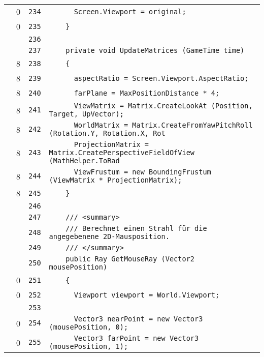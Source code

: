 \documentclass[a4paper,10pt]{article}
\begin{document}
\begin{longtable}[l]{lrrl}
\cellcolor{red} & 0 & \verb~234~ & \verb~      Screen.Viewport = original;~\\
\cellcolor{red} & 0 & \verb~235~ & \verb~    }~\\
\cellcolor{gray} &  & \verb~236~ & \verb~~\\
\cellcolor{gray} &  & \verb~237~ & \verb~    private void UpdateMatrices (GameTime time)~\\
\cellcolor{green} & 8 & \verb~238~ & \verb~    {~\\
\cellcolor{green} & 8 & \verb~239~ & \verb~      aspectRatio = Screen.Viewport.AspectRatio;~\\
\cellcolor{green} & 8 & \verb~240~ & \verb~      farPlane = MaxPositionDistance * 4;~\\
\cellcolor{green} & 8 & \verb~241~ & \verb~      ViewMatrix = Matrix.CreateLookAt (Position, Target, UpVector);~\\
\cellcolor{green} & 8 & \verb~242~ & \verb~      WorldMatrix = Matrix.CreateFromYawPitchRoll (Rotation.Y, Rotation.X, Rot~\\
\cellcolor{green} & 8 & \verb~243~ & \verb~      ProjectionMatrix = Matrix.CreatePerspectiveFieldOfView (MathHelper.ToRad~\\
\cellcolor{green} & 8 & \verb~244~ & \verb~      ViewFrustum = new BoundingFrustum (ViewMatrix * ProjectionMatrix);~\\
\cellcolor{green} & 8 & \verb~245~ & \verb~    }~\\
\cellcolor{gray} &  & \verb~246~ & \verb~~\\
\cellcolor{gray} &  & \verb~247~ & \verb~    /// <summary>~\\
\cellcolor{gray} &  & \verb~248~ & \verb~    /// Berechnet einen Strahl für die angegebenene 2D-Mausposition.~\\
\cellcolor{gray} &  & \verb~249~ & \verb~    /// </summary>~\\
\cellcolor{gray} &  & \verb~250~ & \verb~    public Ray GetMouseRay (Vector2 mousePosition)~\\
\cellcolor{red} & 0 & \verb~251~ & \verb~    {~\\
\cellcolor{red} & 0 & \verb~252~ & \verb~      Viewport viewport = World.Viewport;~\\
\cellcolor{gray} &  & \verb~253~ & \verb~~\\
\cellcolor{red} & 0 & \verb~254~ & \verb~      Vector3 nearPoint = new Vector3 (mousePosition, 0);~\\
\cellcolor{red} & 0 & \verb~255~ & \verb~      Vector3 farPoint = new Vector3 (mousePosition, 1);~\\

\end{longtable}
\end{document}
